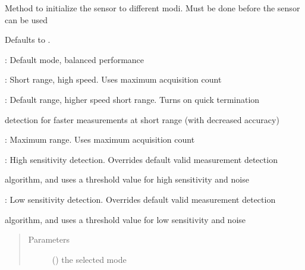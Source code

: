 \documentclass[letterpaper,10pt,english]{sphinxmanual}
\begin{document}
\begin{fulllineitems}
\begin{fulllineitems}
\label{\detokenize{sensor:lib.sensor.Sensor.configure}}
Method to initialize the sensor to different modi. Must be done before the sensor can be used

  Defaults to .

\begin{DUlineblock}{0em}
\item[] : Default mode, balanced performance
\item[] : Short range, high speed. Uses  maximum acquisition count
\item[] : Default range, higher speed short range. Turns on quick termination
\item[]
\begin{DUlineblock}{\DUlineblockindent}
\item[] detection for faster measurements at short range (with decreased accuracy)
\end{DUlineblock}
\item[] : Maximum range. Uses  maximum acquisition count
\item[] : High sensitivity detection. Overrides default valid measurement detection
\item[]
\begin{DUlineblock}{\DUlineblockindent}
\item[] algorithm, and uses a threshold value for high sensitivity and noise
\end{DUlineblock}
\item[] : Low sensitivity detection. Overrides default valid measurement detection
\item[]
\begin{DUlineblock}{\DUlineblockindent}
\item[] algorithm, and uses a threshold value for low sensitivity and noise
\end{DUlineblock}
\end{DUlineblock}
\begin{quote}\begin{description}
\item[{Parameters}] \leavevmode
{} () \textendash{} the selected mode


\end{description}
\end{quote}
\end{fulllineitems}
\end{fulllineitems}
\end{document}
